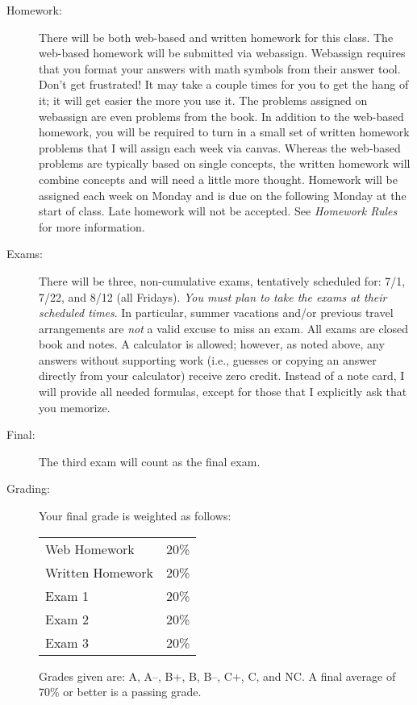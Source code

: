 \documentclass[letterpaper,12pt,fleqn]{article}
\begin{document}
\begin{description}
\item[Homework:] There will be both web-based and written homework for this
    class. The web-based homework will be submitted via webassign. Webassign
    requires that you format your answers with math symbols from their answer
    tool. Don't get frustrated! It may take a couple times for you to get the
    hang of it; it will get easier the more you use it. The problems assigned
    on webassign are even problems from the book. In addition to the web-based
    homework, you will be required to turn in a small set of written homework
    problems that I will assign each week via canvas. Whereas the web-based
    problems are typically based on single concepts, the written homework will
    combine concepts and will need a little more thought. Homework will be
    assigned each week on Monday and is due on the following Monday at the
    start of class. Late homework will not be accepted.  See
    \emph{Homework Rules} for more information.

\item[Exams:] There will be three, non-cumulative exams, tentatively scheduled
    for: 7/1, 7/22, and 8/12 (all Fridays). \emph{You must plan to take the
    exams at their scheduled times}. In particular, summer vacations and/or
    previous travel arrangements are \emph{not} a valid excuse to miss an exam.
    All exams are closed book and notes. A calculator is allowed; however, as
    noted above, any answers without supporting work (i.e., guesses or copying
    an answer directly from your calculator) receive zero credit. Instead of a
    note card, I will provide all needed formulas, except for those that I
    explicitly ask that you memorize.

\item[Final:] The third exam will count as the final exam.

\newpage

\item[Grading:] Your final grade is weighted as follows:

\begin{tabular}{lc}
Web Homework & 20\% \\
Written Homework & 20\% \\
Exam 1 & 20\% \\
Exam 2 & 20\% \\
Exam 3 & 20\% \\
\end{tabular}

Grades given are: A, A--, B+, B, B--, C+, C, and NC. A final average of 70\% or
better is a passing grade.


\end{description}
\end{document}
